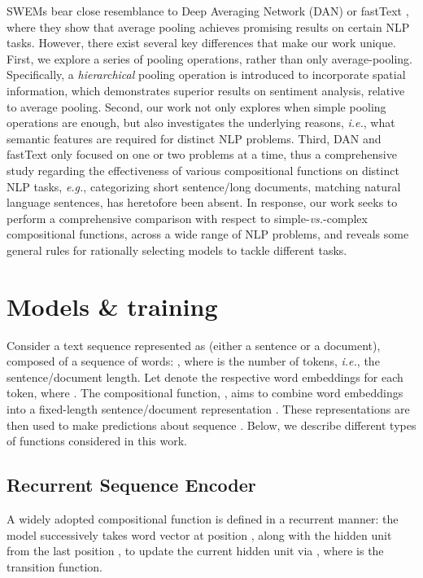 \documentclass[11pt,a4paper]{article}
\begin{document}
SWEMs bear close resemblance to Deep Averaging Network (DAN) \citep{iyyer2015deep} or fastText \citep{joulin2016bag}, where they show that average pooling achieves promising results on certain NLP tasks.
However, there exist several key differences that make our work unique. First, we explore a series of pooling operations, rather than only average-pooling.
Specifically, a \emph{hierarchical} pooling operation is introduced to incorporate spatial information, which demonstrates superior results on sentiment analysis, relative to average pooling.
Second, our work not only explores when simple pooling operations are enough, but also investigates the underlying reasons, \emph{i.e.}, what semantic features are required for distinct NLP problems.
Third, DAN and fastText only focused on one or two problems at a time, thus a comprehensive study regarding the effectiveness of various compositional functions on distinct NLP tasks, \emph{e.g.}, categorizing short sentence/long documents, matching natural language sentences, has heretofore been absent.
In response, our work seeks to perform a comprehensive comparison with respect to simple-\emph{vs.}-complex compositional functions, across a wide range of NLP problems, and reveals some general rules for rationally selecting models to tackle different tasks.

\section{Models \& training}\label{model}
\vspace{-1mm}
Consider a text sequence represented as  (either a sentence or a document), composed of a sequence of words: , where  is the number of tokens, \emph{i.e.}, the sentence/document length.
Let  denote the respective word embeddings for each token, where .
The compositional function, , aims to combine word embeddings into a fixed-length sentence/document representation .
These representations are then used to make predictions about sequence .
Below, we describe different types of functions considered in this work.

\subsection{Recurrent Sequence Encoder}\label{rnn}
\vspace{-1mm}
A widely adopted compositional function is defined in a recurrent manner: the model successively takes word vector  at position , along with the hidden unit  from the last position , to update the current hidden unit via , where  is the transition function.
\end{document}
